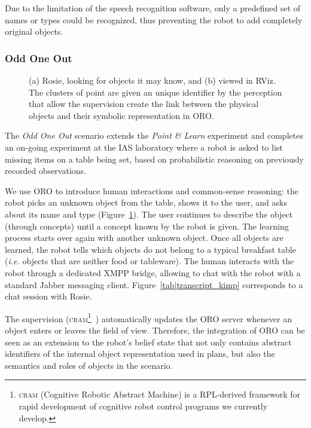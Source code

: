 Due to the limitation of the speech recognition software, only a predefined set of names or types could be recognized, thus preventing the robot to add completely original objects.

\subsubsection{Odd One Out}
\label{odd_one_out}

\begin{figure}
\centering

\caption{(a) Rosie, looking for objects it may know, and (b) viewed in RViz. The clusters of point are given an unique identifier by the perception that allow the supervision create the link between the physical objects and their symbolic representation in ORO.}
\label{fig|kimpwatching}
\end{figure}


The \emph{Odd One Out} scenario extends the \textit{Point \& Learn} experiment and completes an on-going experiment at the IAS laboratory where a robot is asked to list missing items on a table being set, based on probabilistic reasoning on previously recorded observations.

We use ORO to introduce human interactions and common-sense reasoning: the robot picks an unknown object from the table, shows it to the user, and asks about its name and type (Figure~\ref{fig|kimpwatching}). The user continues to describe the object (through concepts) until a concept known by the robot is given. The learning process starts over again with another unknown object. Once all objects are learned, the robot tells which objects do not belong to a typical breakfast table (\textit{i.e.} objects that are neither food or tableware). The human interacts with the robot through a dedicated XMPP bridge, allowing to chat with the robot with a standard Jabber messaging client. Figure~\ref{tab|transcript_kimp} corresponds to a chat session with Rosie.

The supervision (\textsc{cram}\footnote{\textsc{cram} (Cognitive Robotic Abstract Machine) is a RPL-derived framework for rapid development of cognitive robot control programs we currently develop.}~\cite{Beetz2010}) automatically updates the ORO server whenever an object enters or leaves the field of view.
Therefore, the integration of ORO can be seen as an extension to
the robot's belief state that not only contains abstract identifiers
of the internal object representation used in plans, but also the
semantics and roles of objects in the scenario.

